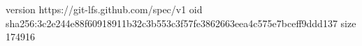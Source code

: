 version https://git-lfs.github.com/spec/v1
oid sha256:3c2e244e88f60918911b32c3b553c3f57fe3862663eea4c575e7bceff9ddd137
size 174916
